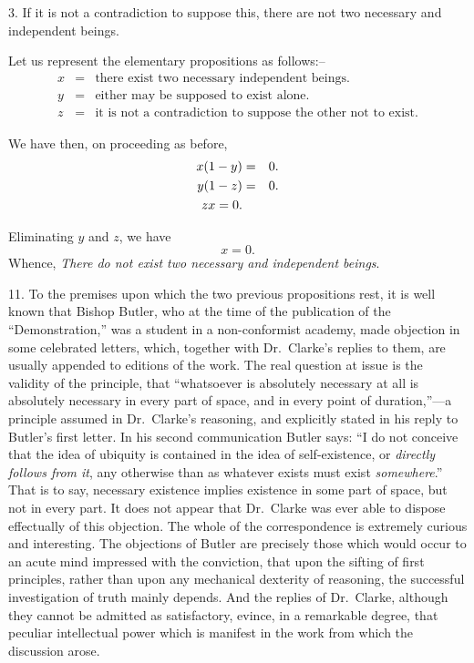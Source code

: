 \documentclass[oneside]{book}
\begin{document}
3. If it is not a contradiction to suppose this, there are not
two necessary and independent beings.

Let us represent the elementary propositions as follows:--
\begin{eqnarray*}
x &=& \textrm{there exist two necessary independent beings.}\\
y &=& \textrm{either may be supposed to exist alone.}\\
z &=& \textrm{it is not a contradiction to suppose the other not to exist.}
\end{eqnarray*}

We have then, on proceeding as before,
\begin{eqnarray}\setcounter{equation}{1}
x(1-y) &=& 0.\\
y(1-z) &=& 0.\\
zx = 0.
\end{eqnarray}


Eliminating $y$ and $z$, we have
\[
x=0.
\]
Whence, \textit{There do not exist two necessary and independent beings}.

11. To the premises upon which the two previous propositions
rest, it is well known that Bishop Butler, who at the time of the
publication of the ``Demonstration,'' was a student in a non-conformist academy, made objection in some celebrated letters,
which, together with Dr.\ Clarke's replies to them, are usually
appended to editions of the work. The real question at issue is
the validity of the principle, that ``whatsoever is absolutely necessary
at all is absolutely necessary in every part of space, and
in every point of duration,''---a principle assumed in Dr.\ Clarke's
reasoning, and explicitly stated in his reply to Butler's first letter.
In his second communication Butler says: ``I do not conceive
that the idea of ubiquity is contained in the idea of self-existence, or \textit{directly follows from it}, any otherwise than as whatever exists must exist \textit{somewhere}.'' That is to say, necessary
existence implies existence in some part of space, but not in
every part. It does not appear that Dr.\ Clarke was ever able to
dispose effectually of this objection. The whole of the correspondence is extremely curious and interesting. The objections
of Butler are precisely those which would occur to an acute mind
impressed with the conviction, that upon the sifting of first principles,
rather than upon any mechanical dexterity of reasoning,
the successful investigation of truth mainly depends. And the
replies of Dr.\ Clarke, although they cannot be admitted as satisfactory,
evince, in a remarkable degree, that peculiar intellectual
power which is manifest in the work from which the discussion
arose.
\end{document}
